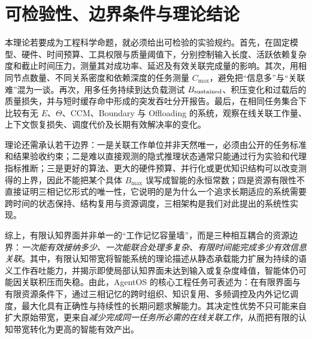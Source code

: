 \section{可检验性、边界条件与理论结论}
\label{sec:theory_tests}

本理论若要成为工程科学命题，就必须给出可检验的实验规约。首先，在固定模型、硬件、时间预算、工具权限与质量阈值下，分别控制输入长度、活跃依赖复杂度和截止时间压力，测量其对成功率、延迟及有效关联完成量的影响。其次，用相同节点数量、不同关系密度和依赖深度的任务测量 $C_{\max}$，避免把“信息多”与“关联难”混为一谈。再次，用多任务持续到达负载测试 $B_{\rm sustained}$、积压变化和过载后的质量损失，并与短时缓存命中形成的突发吞吐分开报告。最后，在相同任务集合下比较有无 $E$、$\Theta$、CCM、Boundary 与 Offloading 的系统，观察在线关联工作量、上下文恢复损失、调度代价及长期有效解决率的变化。

理论还需承认若干边界：一是关联工作单位并非天然唯一，必须由公开的任务标准和结果验收约束；二是难以直接观测的隐式推理状态通常只能通过行为实验和代理指标推断；三是更好的算法、更大的硬件预算、并行化或更优知识结构可以改变测得的上界，因此不能把某个具体 $B_{\max}$ 误写成智能的永恒常数；四是资源有限性不直接证明三相记忆形式的唯一性，它说明的是为什么一个追求长期适应的系统需要跨时间的状态保持、结构复用与资源调度，三相架构是我们对此提出的系统性实现。

综上，有限认知界面并非单一的“工作记忆容量墙”，而是三种相互耦合的资源边界：\emph{一次能有效接纳多少、一次能联合处理多复杂、有限时间能完成多少有效信息关联}。其中，有限认知带宽将智能系统的理论描述从静态承载能力扩展为持续的语义工作吞吐能力，并揭示即使局部认知界面未达到输入或复杂度峰值，智能体仍可能因关联积压而失稳。由此，AgentOS 的核心工程任务可表述为：在有限界面与有限资源条件下，通过三相记忆的跨时组织、知识复用、多频调控及内外记忆调度，最大化具有正确性与持续性的长期问题求解能力。其决定性优势不只可能来自扩大原始带宽，更来自\emph{减少完成同一任务所必需的在线关联工作}，从而把有限的认知带宽转化为更高的智能有效产出。
